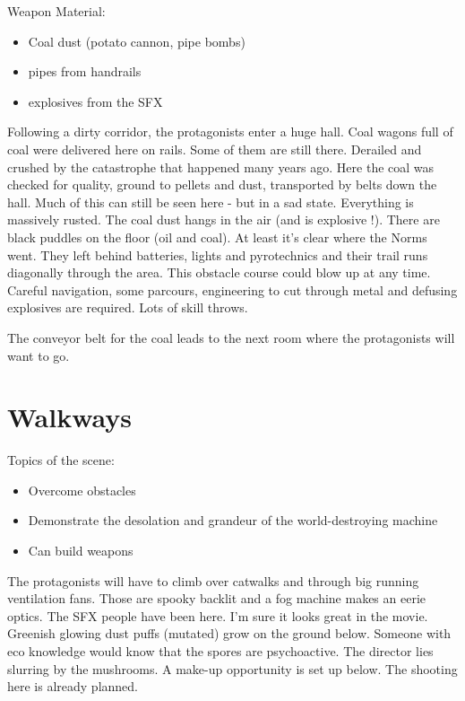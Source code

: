 Weapon Material:

\begin{itemize}
\item Coal dust (potato cannon, pipe bombs)
\item pipes from handrails
\item explosives from the SFX
\end{itemize}

Following a dirty corridor, the protagonists enter a huge hall. Coal wagons full of coal were delivered here on rails. Some of them are still there. Derailed and crushed by the catastrophe that happened many years ago. Here the coal was checked for quality, ground to pellets and dust, transported by belts down the hall. Much of this can still be seen here - but in a sad state.
Everything is massively rusted. The coal dust hangs in the air (and is explosive !). There are black puddles on the floor (oil and coal).
At least it's clear where the Norms went. They left behind batteries, lights and pyrotechnics and their trail runs diagonally through the area. This obstacle course could blow up at any time. Careful navigation, some parcours, engineering to cut through metal and defusing explosives are required. Lots of skill throws.

The conveyor belt for the coal leads to the next room where the protagonists will want to go.


\section{Walkways}

Topics of the scene:
\begin{itemize}
\item Overcome obstacles
\item Demonstrate the desolation and grandeur of the world-destroying machine
\item Can build weapons
\end{itemize}

The protagonists will have to climb over catwalks and through big running ventilation fans.
Those are spooky backlit and a fog machine makes an eerie optics. The SFX people have been here. I'm sure it looks great in the movie.
Greenish glowing dust puffs (mutated) grow on the ground below. Someone with eco knowledge would know that the spores are psychoactive. The director lies slurring by the mushrooms.
A make-up opportunity is set up below. The shooting here is already planned.


